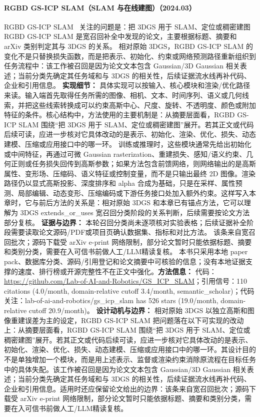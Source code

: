 \paragraph{RGBD GS-ICP SLAM（SLAM 与在线建图）（2024.03）}
RGBD GS-ICP SLAM~\cite{2403_12550} 关注的问题是：把 3DGS 用于 SLAM、定位或稠密建图 RGBD GS-ICP SLAM 是宽召回补全中发现的论文，主要根据标题、摘要和 arXiv 类别判定其与 3DGS 的关系。
相对原始 3DGS，RGBD GS-ICP SLAM 的变化不是只替换损失函数，而是把表示、初始化、约束或网络预测路径重新组织到任务流程中：该工作被召回是因为论文文本包含 Gaussian/3D Gaussian 相关表述；当前分类先确定其任务域和与 3DGS 的相关性，后续证据流水线再补代码、企业和引用信息。
\textbf{实现细节：} 具体实现可以按输入、核心模块和渲染/优化路径来读。输入端首先取得任务所需的图像、相机、文本、时间序列、语义或几何线索，并把这些线索转换成可以约束高斯中心、尺度、旋转、不透明度、颜色或附加特征的条件。核心结构中，方法使用的主要机制是：从摘要层面看，RGBD GS-ICP SLAM 围绕“把 3DGS 用于 SLAM、定位或稠密建图”展开。若其正文或代码后续可读，应进一步核对它具体改动的是表示、初始化、渲染、优化、损失、动态建模、压缩或应用接口中的哪一环。 训练或推理时，这些模块通常先给出初始化或中间特征，再通过可微 Gaussian rasterization、重建损失、感知/语义约束、几何正则或任务损失回传到高斯参数；如果方法包含前馈网络，则网络输出的是高斯属性、变形场、压缩码、语义特征或控制变量，而不是只输出最终 2D 图像。渲染路径仍以显式高斯投影、深度排序和 alpha 合成为基础，只是在采样、属性预测、局部编辑、动态变形、压缩编码或下游任务接口处加入额外约束。这样写入本章时，它与前后方法的关系是：相对原始 3DGS 和本章已有锚点方法，它可以理解为 3DGS extends\_or\_uses 宽召回分类阶段的关系判断，后续需要按论文方法部分复核。
\textbf{证据与边界：} 本轮召回分类尚未逐项核对实验表格；后续证据补全阶段需要读取论文源码/PDF或项目页确认数据集、指标和对比方法。 该条来自宽召回批次；源码下载受 arXiv e-print 网络限制，部分论文暂时只能依据标题、摘要和类别分类，需要在入可信书前做人工/LLM精读复核。 本书只采用本地 paper pack、数据库分类、源码/引用登记和论文摘要中可核验的信息；没有本地证据支撑的速度、排行榜或开源完整性不在正文中强化。\textbf{方法信息：} 代码：\url{https://github.com/Lab-of-AI-and-Robotics/GS\_ICP\_SLAM}；引用信号：110 citations (4.0/month, domain-relative cutoff 3.4/month, semantic\_scholar)；代码关注：lab-of-ai-and-robotics/gs\_icp\_slam has 526 stars (19.0/month, domain-relative cutoff 20.9/month)。
\textbf{设计动机与边界：} 相对原始 3DGS 以独立高斯和图像重建误差为主的设定，RGBD GS-ICP SLAM 把问题落在以下可实现的改动上：从摘要层面看，RGBD GS-ICP SLAM 围绕“把 3DGS 用于 SLAM、定位或稠密建图”展开。若其正文或代码后续可读，应进一步核对它具体改动的是表示、初始化、渲染、优化、损失、动态建模、压缩或应用接口中的哪一环。其设计目的不是单独增加一个模块，而是用上述表示、监督或渲染约束消除原流程在目标任务中的具体失配。该工作被召回是因为论文文本包含 Gaussian/3D Gaussian 相关表述；当前分类先确定其任务域和与 3DGS 的相关性，后续证据流水线再补代码、企业和引用信息。适用时还应保留论文给出的边界：该条来自宽召回批次；源码下载受 arXiv e-print 网络限制，部分论文暂时只能依据标题、摘要和类别分类，需要在入可信书前做人工/LLM精读复核。

